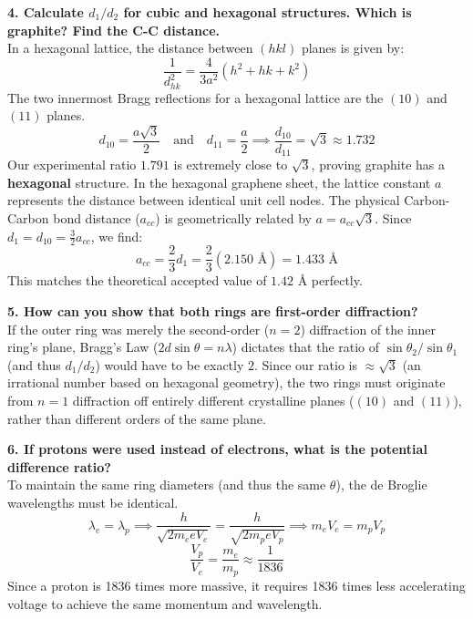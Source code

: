 \documentclass[a4paper,11pt]{article}
\begin{document}
\noindent\textbf{4. Calculate $d_1/d_2$ for cubic and hexagonal structures. Which is graphite? Find the C-C distance.} \\
In a hexagonal lattice, the distance between $(hkl)$ planes is given by:
\begin{equation*}
    \frac{1}{d_{hk}^2} = \frac{4}{3a^2} (h^2 + hk + k^2)
\end{equation*}
The two innermost Bragg reflections for a hexagonal lattice are the $(10)$ and $(11)$ planes.
\begin{equation*}
    d_{10} = \frac{a\sqrt{3}}{2} \quad \text{and} \quad d_{11} = \frac{a}{2} \implies \frac{d_{10}}{d_{11}} = \sqrt{3} \approx 1.732
\end{equation*}
Our experimental ratio $1.791$ is extremely close to $\sqrt{3}$, proving graphite has a \textbf{hexagonal} structure.
In the hexagonal graphene sheet, the lattice constant $a$ represents the distance between identical unit cell nodes. The physical Carbon-Carbon bond distance ($a_{cc}$) is geometrically related by $a = a_{cc}\sqrt{3}$.
Since $d_1 = d_{10} = \frac{3}{2} a_{cc}$, we find:
\begin{equation*}
    a_{cc} = \frac{2}{3} d_1 = \frac{2}{3}(2.150\text{ \AA}) = 1.433\text{ \AA}
\end{equation*}
This matches the theoretical accepted value of $1.42\text{ \AA}$ perfectly.

\noindent\textbf{5. How can you show that both rings are first-order diffraction?} \\
If the outer ring was merely the second-order ($n=2$) diffraction of the inner ring's plane, Bragg's Law ($2d\sin\theta = n\lambda$) dictates that the ratio of $\sin\theta_2 / \sin\theta_1$ (and thus $d_1/d_2$) would have to be exactly $2$. Since our ratio is $\approx \sqrt{3}$ (an irrational number based on hexagonal geometry), the two rings must originate from $n=1$ diffraction off entirely different crystalline planes ($(10)$ and $(11)$), rather than different orders of the same plane.

\noindent\textbf{6. If protons were used instead of electrons, what is the potential difference ratio?} \\
To maintain the same ring diameters (and thus the same $\theta$), the de Broglie wavelengths must be identical.
\begin{equation*}
    \lambda_e = \lambda_p \implies \frac{h}{\sqrt{2 m_e e V_e}} = \frac{h}{\sqrt{2 m_p e V_p}} \implies m_e V_e = m_p V_p
\end{equation*}
\begin{equation*}
    \frac{V_p}{V_e} = \frac{m_e}{m_p} \approx \frac{1}{1836}
\end{equation*}
Since a proton is 1836 times more massive, it requires 1836 times less accelerating voltage to achieve the same momentum and wavelength.
\end{document}
